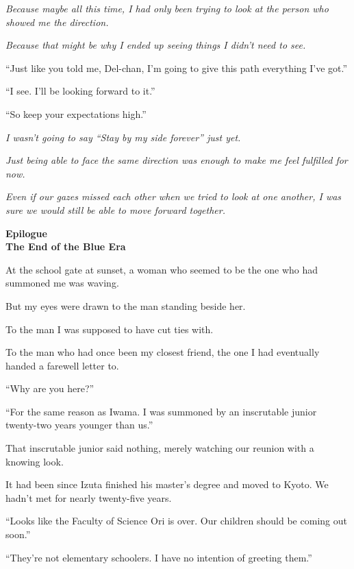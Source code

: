 \documentclass[
    a4paper,
    12pt,
    twoside,
    openany,
    UTF8,
    fontset=windows
]{ctexbook}
\begin{document}
\textit{Because maybe all this time, I had only been trying to look at the person who showed me the direction.}

\textit{Because that might be why I ended up seeing things I didn't need to see.}

``Just like you told me, Del-chan, I'm going to give this path everything I've got.''

``I see. I'll be looking forward to it.''

``So keep your expectations high.''

\textit{I wasn't going to say ``Stay by my side forever'' just yet.}

\textit{Just being able to face the same direction was enough to make me feel fulfilled for now.}

\textit{Even if our gazes missed each other when we tried to look at one another, I was sure we would still be able to move forward together.}

\clearpage
\thispagestyle{plain}
\begin{center}
    \large\bfseries
    Epilogue\\
    The End of the Blue Era
\end{center}
\label{sec:epilogueV3}
\vspace{1cm}

At the school gate at sunset, a woman who seemed to be the one who had summoned me was waving.

But my eyes were drawn to the man standing beside her.

To the man I was supposed to have cut ties with.

To the man who had once been my closest friend, the one I had eventually handed a farewell letter to.

``Why are you here?''

``For the same reason as Iwama. I was summoned by an inscrutable junior twenty-two years younger than us.''

That inscrutable junior said nothing, merely watching our reunion with a knowing look.

It had been since Izuta finished his master's degree and moved to Kyoto. We hadn't met for nearly twenty-five years.

``Looks like the Faculty of Science Ori is over. Our children should be coming out soon.''

``They're not elementary schoolers. I have no intention of greeting them.''
\end{document}
